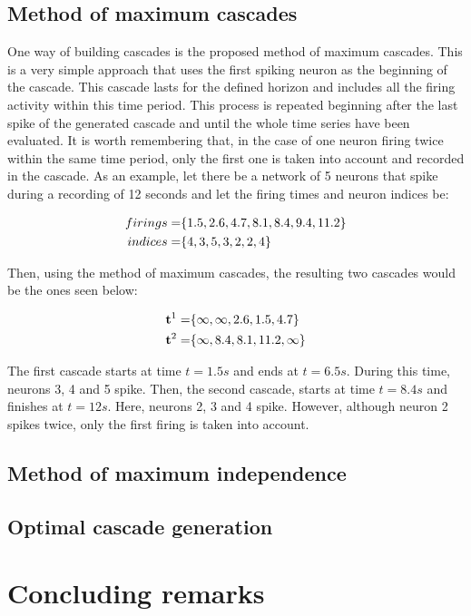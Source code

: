 \subsection{Method of maximum cascades}

One way of building cascades is the proposed method of maximum cascades. This is a very simple approach that uses the first spiking neuron as the beginning of the cascade. This cascade lasts for the defined horizon and includes all the firing activity within this time period. This process is repeated beginning after the last spike of the generated cascade and until the whole time series have been evaluated. It is worth remembering that, in the case of one neuron firing twice within the same time period, only the first one is taken into account and recorded in the cascade. As an example, let there be a network of 5 neurons that spike during a recording of 12 seconds and let the firing times and neuron indices be:

\begin{align}
	\centering
	firings = &\{1.5, 2.6, 4.7, 8.1, 8.4, 9.4, 11.2\}\\
	indices = &\{4,  3,  5,  3,  2,  2, 4\}
\end{align}

Then, using the method of maximum cascades, the resulting two cascades would be the ones seen below:

\begin{align}
	\centering
	\textbf{t}^{1} = &\{\infty, \infty, 2.6, 1.5, 4.7 \}\\
	\textbf{t}^{2} = &\{\infty, 8.4, 8.1, 11.2, \infty \}
\end{align}

The first cascade starts at time \(t=1.5s\) and ends at \(t=6.5s\). During this time, neurons 3, 4 and 5 spike. Then, the second cascade, starts at time \(t=8.4s\) and finishes at \(t=12s\). Here, neurons 2, 3 and 4 spike. However, although neuron 2 spikes twice, only the first firing is taken into account.


\subsection{Method of maximum independence}



\subsection{Optimal cascade generation}
\section{Concluding remarks}


